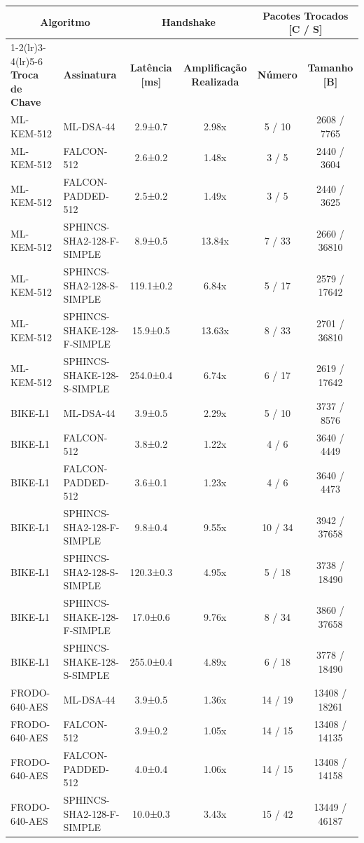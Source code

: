 \documentclass[10pt]{article}
\begin{document}
\centering
\small
\begin{tabular}{@{}l l c c c c@{}}
\toprule
\multicolumn{2}{c}{\textbf{Algoritmo}} & \multicolumn{2}{c}{\textbf{Handshake}} & \multicolumn{2}{c}{\textbf{Pacotes Trocados [C / S]}} \\
\cmidrule(lr){1-2}\cmidrule(lr){3-4}\cmidrule(lr){5-6}
\textbf{Troca de Chave} & \textbf{Assinatura} & \textbf{Latência [ms]} & \textbf{Amplificação Realizada} & \textbf{Número} & \textbf{Tamanho [B]} \\
\midrule
ML-KEM-512 & ML-DSA-44 & 2.9±0.7 & 2.98x & 5 / 10 & 2608 / 7765 \\
ML-KEM-512 & FALCON-512 & 2.6±0.2 & 1.48x & 3 / 5 & 2440 / 3604 \\
ML-KEM-512 & FALCON-PADDED-512 & 2.5±0.2 & 1.49x & 3 / 5 & 2440 / 3625 \\
ML-KEM-512 & SPHINCS-SHA2-128-F-SIMPLE & 8.9±0.5 & 13.84x & 7 / 33 & 2660 / 36810 \\
ML-KEM-512 & SPHINCS-SHA2-128-S-SIMPLE & 119.1±0.2 & 6.84x & 5 / 17 & 2579 / 17642 \\
ML-KEM-512 & SPHINCS-SHAKE-128-F-SIMPLE & 15.9±0.5 & 13.63x & 8 / 33 & 2701 / 36810 \\
ML-KEM-512 & SPHINCS-SHAKE-128-S-SIMPLE & 254.0±0.4 & 6.74x & 6 / 17 & 2619 / 17642 \\
BIKE-L1 & ML-DSA-44 & 3.9±0.5 & 2.29x & 5 / 10 & 3737 / 8576 \\
BIKE-L1 & FALCON-512 & 3.8±0.2 & 1.22x & 4 / 6 & 3640 / 4449 \\
BIKE-L1 & FALCON-PADDED-512 & 3.6±0.1 & 1.23x & 4 / 6 & 3640 / 4473 \\
BIKE-L1 & SPHINCS-SHA2-128-F-SIMPLE & 9.8±0.4 & 9.55x & 10 / 34 & 3942 / 37658 \\
BIKE-L1 & SPHINCS-SHA2-128-S-SIMPLE & 120.3±0.3 & 4.95x & 5 / 18 & 3738 / 18490 \\
BIKE-L1 & SPHINCS-SHAKE-128-F-SIMPLE & 17.0±0.6 & 9.76x & 8 / 34 & 3860 / 37658 \\
BIKE-L1 & SPHINCS-SHAKE-128-S-SIMPLE & 255.0±0.4 & 4.89x & 6 / 18 & 3778 / 18490 \\
FRODO-640-AES & ML-DSA-44 & 3.9±0.5 & 1.36x & 14 / 19 & 13408 / 18261 \\
FRODO-640-AES & FALCON-512 & 3.9±0.2 & 1.05x & 14 / 15 & 13408 / 14135 \\
FRODO-640-AES & FALCON-PADDED-512 & 4.0±0.4 & 1.06x & 14 / 15 & 13408 / 14158 \\
FRODO-640-AES & SPHINCS-SHA2-128-F-SIMPLE & 10.0±0.3 & 3.43x & 15 / 42 & 13449 / 46187 \\

\end{tabular}
\end{document}
